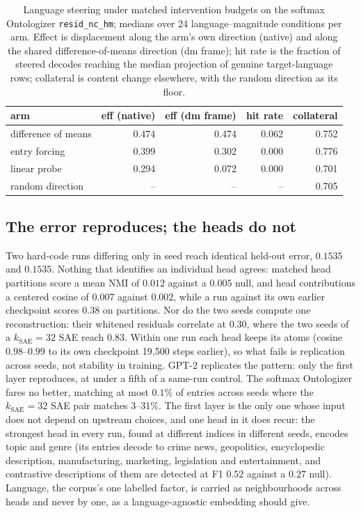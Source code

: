 \begin{table}[tp]\centering\small
\begin{tabular}{@{}lrrrr@{}}
\toprule
arm & eff (native) & eff (dm frame) & hit rate & collateral \\
\midrule
difference of means    & 0.474 & 0.474 & 0.062 & 0.752 \\
entry forcing          & 0.399 & 0.302 & 0.000 & 0.776 \\
linear probe           & 0.294 & 0.072 & 0.000 & 0.701 \\
random direction       & --    & --    & --   & 0.705 \\
\bottomrule
\end{tabular}
\caption{Language steering under matched intervention budgets on the
softmax Ontologizer \texttt{resid\_nc\_hm}; medians over 24
language--magnitude conditions per arm. Effect is displacement along the
arm's own direction (native) and along the shared difference-of-means
direction (dm frame); hit rate is the fraction of steered decodes
reaching the median projection of genuine target-language rows;
collateral is content change elsewhere, with the random direction as its
floor.}
\label{tab:steer-overlay}
\end{table}

\subsection{The error reproduces; the heads do not}
\label{sec:prelim-seed}
Two hard-code runs differing only in seed reach identical held-out error,
$0.1535$ and $0.1535$. Nothing that identifies an individual head
agrees: matched head partitions score a mean NMI of $0.012$ against a
$0.005$ null, and head contributions a centered cosine of $0.007$
against $0.002$, while a run against its own earlier checkpoint scores
$0.38$ on partitions. Nor do the two seeds compute one reconstruction:
their whitened residuals correlate at $0.30$, where the two seeds of a
$k_{\mathrm{SAE}}{=}32$ SAE reach $0.83$. Within one run each head keeps
its atoms (cosine $0.98$--$0.99$ to its own checkpoint 19{,}500 steps
earlier), so what fails is replication across seeds, not stability in
training. GPT-2 replicates the pattern: only the first
layer reproduces, at under a fifth of a same-run control. The softmax
Ontologizer fares no better, matching at most $0.1\%$ of entries across
seeds where the $k_{\mathrm{SAE}}{=}32$ SAE pair matches 3--31\%. The first layer is the
only one whose input does not depend on upstream choices, and one head
in it does recur: the strongest head in every run, found at different
indices in different seeds, encodes topic and genre (its entries decode
to crime news, geopolitics, encyclopedic description, manufacturing,
marketing, legislation and entertainment, and contrastive descriptions
of them are detected at F1 $0.52$ against a $0.27$ null). Language, the
corpus's one labelled factor, is carried as neighbourhoods across heads
and never by one, as a language-agnostic embedding should give.


